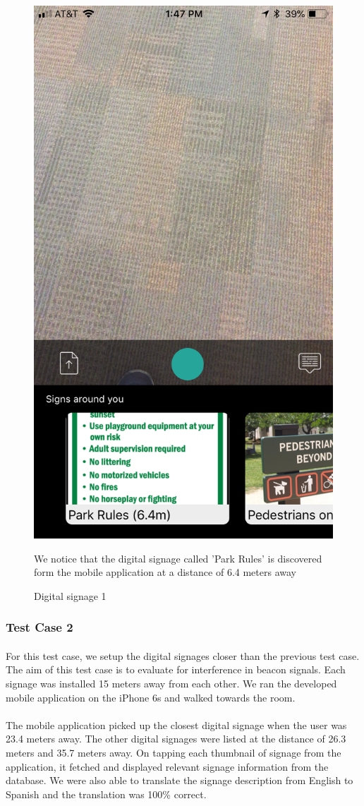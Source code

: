 \documentclass[12pt]{article}
\begin{document}
       \begin{figure}[H]
	\centering
	\includegraphics[width=0.5\linewidth]{media/test1.png}
	\caption{Digital signage 1}{We notice that the digital signage called 'Park Rules' is discovered form the mobile application at a distance of 6.4 meters away}
	\label{fig:engyo}
\end{figure} 

\subsubsection{Test Case 2}
\label{one2one}
\paragraph{}For this test case, we setup the digital signages closer than the previous test case. The aim of this test case is to evaluate for interference in beacon signals. Each signage was installed  15 meters away from each other. We ran the developed mobile application on the iPhone 6s and walked towards the room.

\paragraph{}The mobile application picked up the closest digital signage when the user was 23.4 meters away. The other digital signages were listed at the distance of 26.3 meters and 35.7 meters away. On tapping each thumbnail of signage from the application, it fetched and displayed relevant signage information from the database. We were also able to translate the signage description from English to Spanish and the translation was 100\% correct.
\end{document}
